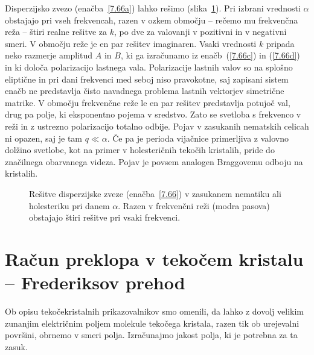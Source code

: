 \begin{remark}
Disperzijsko zvezo (enačba~\ref{7.66a}) 
lahko rešimo (slika~\ref{gap}). Pri izbrani vrednosti $\alpha$ 
obstajajo pri vseh frekvencah, razen v ozkem območju -- rečemo mu frekvenčna reža --
štiri realne rešitve za $k$, po dve za valovanji v pozitivni in v negativni smeri.
V območju reže je en par rešitev imaginaren. Vsaki vrednosti $k$
pripada neko razmerje amplitud $A$ in $B$, ki ga izračunamo
iz enačb~(\ref{7.66c}) in (\ref{7.66d}) in ki določa polarizacijo lastnega vala. Polarizacije
lastnih valov so na splošno eliptične in pri dani frekvenci med
seboj niso pravokotne, saj zapisani sistem enačb ne predstavlja čisto 
navadnega problema lastnih vektorjev simetrične matrike. 
V območju frekvenčne reže le en par rešitev predstavlja
potujoč val, drug pa polje, ki eksponentno pojema v sredstvo. Zato
se svetloba s frekvenco v reži in z ustrezno polarizacijo totalno odbije. Pojav v zasukanih
nematskih celicah ni opazen, saj je tam $q \ll \alpha$. Če pa je perioda vijačnice
primerljiva z valovno dolžino svetlobe, kot na primer v holesteričnih
tekočih kristalih, pride do značilnega obarvanega videza. Pojav
je povsem analogen Braggovemu odboju na kristalih.
\begin{figure}[h]
\centering
\def\svgwidth{80truemm} 

\caption{Rešitve disperzijske zveze (enačba~\ref{7.66}) v zasukanem nematiku
ali holesteriku pri danem $\alpha$. Razen v frekvenčni reži (modra pasova) obstajajo štiri 
rešitve pri vsaki frekvenci.}
\label{gap}
\end{figure}
\end{remark}

\section{Račun preklopa v tekočem kristalu -- Frederiksov prehod}
Ob opisu tekočekristalnih prikazovalnikov smo omenili, da lahko z dovolj velikim 
zunanjim električnim poljem molekule tekočega kristala, razen tik ob urejevalni površini,
obrnemo v smeri polja. Izračunajmo jakost polja, ki je potrebna za ta zasuk. 

